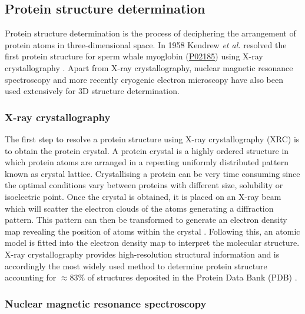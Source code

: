 \vspace{-13pt} %
\vspace{-6pt} %

\subsection{Protein structure determination}

Protein structure determination is the process of deciphering the arrangement of protein atoms in three-dimensional space. In 1958 Kendrew \textit{et al.} \cite{KENDREW_1958_MYOGLOBIN} resolved the first protein structure for sperm whale myoglobin (\href{https://www.uniprot.org/uniprotkb/P02185/entry}{P02185}) using X-ray crystallography \cite{BERNAL_1934_XRAY}. Apart from X-ray crystallography, nuclear magnetic resonance spectroscopy and more recently cryogenic electron microscopy have also been used extensively for 3D structure determination.

\subsubsection{X-ray crystallography}

The first step to resolve a protein structure using X-ray crystallography (XRC) is to obtain the protein crystal. A protein crystal is a highly ordered structure in which protein atoms are arranged in a repeating uniformly distributed pattern known as crystal lattice. Crystallising a protein can be very time consuming since the optimal conditions vary between proteins with different size, solubility or isoelectric point. Once the crystal is obtained, it is placed on an X-ray beam which will scatter the electron clouds of the atoms generating a diffraction pattern. This pattern can then be transformed to generate an electron density map revealing the position of atoms within the crystal \cite{FRIEDRICH_1913_XRAY, BRAGG_1913_XRAY}. Following this, an atomic model is fitted into the electron density map to interpret the molecular structure. X-ray crystallography provides high-resolution structural information and is accordingly the most widely used method to determine protein structure accounting for $\approx$83\% of structures deposited in the Protein Data Bank (PDB) \cite{BERMAN_2000_PDB}.

\subsubsection{Nuclear magnetic resonance spectroscopy}

